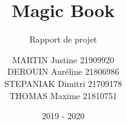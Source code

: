 \documentclass[report]{BetterDocument}
\title{Magic Book}
\subtitle{Rapport de projet}
\author{MARTIN Justine 21909920\\
	DEROUIN Auréline 21806986\\
	STEPANIAK Dimitri 21709178\\
	THOMAS Maxime 21810751
}
\date{2019 - 2020}
\institute{Unicaen}
\begin{document}
	\pageDeGarde

	\tableDesMatieres

	
\end{document}
